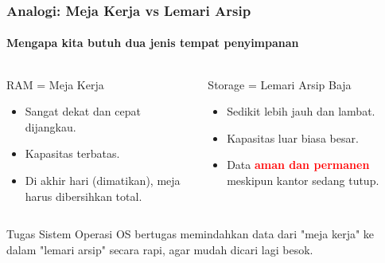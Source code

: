 \documentclass[t,aspectratio=169,xcolor=dvipsnames]{beamer}
\newcommand{\tem}[1]{\textbf{\textcolor{red}{#1}}}
\begin{document}
\begin{frame}
    \frametitle{Analogi: Meja Kerja vs Lemari Arsip}
    \framesubtitle{Mengapa kita butuh dua jenis tempat penyimpanan}

    \begin{columns}[T]
        \begin{block}{RAM = Meja Kerja}
            \begin{itemize}
                \item Sangat dekat dan cepat dijangkau.
                \item Kapasitas terbatas.
                \item Di akhir hari (dimatikan), meja harus dibersihkan total.
            \end{itemize}
        \end{block}

        \begin{block}{Storage = Lemari Arsip Baja}
            \begin{itemize}
                \item Sedikit lebih jauh dan lambat.
                \item Kapasitas luar biasa besar.
                \item Data \tem{aman dan permanen} meskipun kantor sedang tutup.
            \end{itemize}
        \end{block}
    \end{columns}

    \vspace{0.4cm}
    \begin{exampleblock}{Tugas Sistem Operasi}
        OS bertugas memindahkan data dari "meja kerja" ke dalam "lemari arsip" secara rapi, agar mudah dicari lagi besok.
    \end{exampleblock}
\end{frame}
\end{document}
